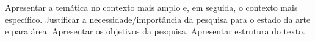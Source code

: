 Apresentar a temática no contexto mais amplo e, em seguida, o contexto mais específico. Justificar a necessidade/importância da pesquisa para o estado da arte e para área. Apresentar os objetivos da pesquisa. Apresentar estrutura do texto. \cite{IEEEexample:techrepstdsub}